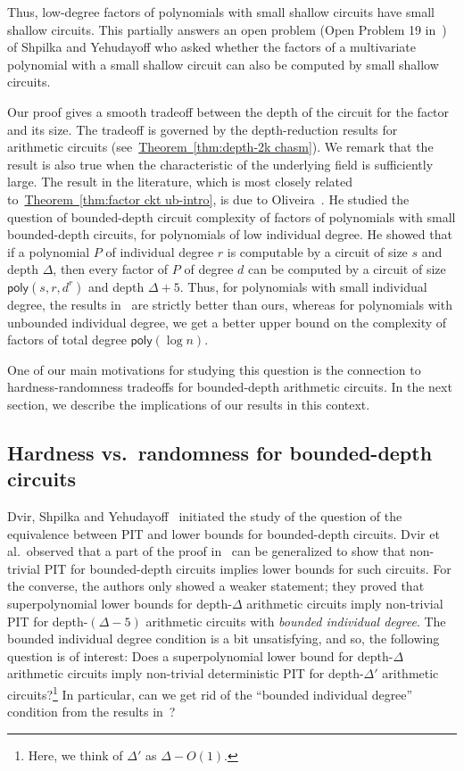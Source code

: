 \documentclass[11pt]{article}
\numberwithin{equation}{section}
\theoremstyle{definition}
\theoremstyle{plain}
\newcommand{\expref}[2]{\hyperref[#2]{#1~\ref{#2}}}
\newcommand{\func}[1]{{\ensuremath{\mathsf{#1}}}}
\newcommand{\poly}{\func{poly}}
\begin{document}
Thus, low-degree factors of polynomials with small
%
%
shallow circuits have small
%
%
shallow circuits.
%
%
This partially answers an open problem (Open Problem 19 in~\cite{sy}) of Shpilka and Yehudayoff who asked whether the factors of a multivariate polynomial with a small shallow circuit can also be computed by small shallow circuits. 

Our proof gives a smooth tradeoff between  
the depth of the circuit for the factor and its size.
The tradeoff is governed by the
%
depth-reduction    %
results for arithmetic circuits (see~\expref{Theorem}{thm:depth-2k chasm}). 
We remark that the result is also true when the characteristic of the underlying field is sufficiently large. 
The result in the literature, which is most closely related to~\expref{Theorem}{thm:factor ckt ub-intro}, is due to Oliveira~\cite{O16}. He studied the question of
%
bounded-depth   %
circuit complexity of factors of polynomials with small
%
bounded-depth   %
circuits, for polynomials of low individual degree. He showed that if a polynomial $P$ of individual degree $r$ is computable by a circuit of size $s$ and depth $\Delta$, then every factor of $P$ of degree
%
$d$ can be computed by a circuit of size $\poly(s, r, d^r)$ and depth %
$\Delta + 5$. Thus, for polynomials with small individual degree, the results in~\cite{O16} are strictly better than ours, whereas for polynomials with unbounded individual degree, we get a better upper bound on the complexity of factors of total degree %
$\poly(\log n)$.

One of our main motivations for studying this question is the connection to hardness-randomness tradeoffs for
%
bounded-depth   %
arithmetic circuits. In the next section, we describe the implications of our results in this context. 

%
%
%
%
\subsection{Hardness vs.\ randomness for bounded-depth circuits}
Dvir, Shpilka and Yehudayoff~\cite{DSY09} initiated the study of the question of the equivalence between PIT and lower bounds for
%
bounded-depth   %
circuits. Dvir et al.\ observed that a part of the proof in~\cite{ki03} can be generalized to show that non-trivial PIT for
%
bounded-depth   %
circuits implies lower bounds for such circuits. For the converse, the authors only showed a weaker statement; they proved that 
%
superpolynomial %
lower bounds for
%
depth-$\Delta$    %
arithmetic circuits %
imply non-trivial PIT for
%
depth-$(\Delta-5)$   %
arithmetic circuits with \emph{bounded individual degree}. The bounded individual degree condition is a bit unsatisfying, and so, the following question is of
interest: %
Does a 
%
superpolynomial %
lower bound for
%
depth-$\Delta$      %
arithmetic circuits imply non-trivial deterministic PIT for
%
depth-$\Delta'$     %
%
%
%
arithmetic circuits?\footnote{Here, we think of $\Delta'$ as $\Delta - O(1)$.} In particular, can we get rid of the ``bounded individual degree'' condition from the results in~\cite{DSY09}?
\end{document}

